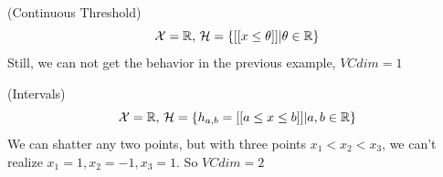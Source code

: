 \documentclass{article}
\begin{document}
\begin{example}(Continuous Threshold)
  \begin{displaymath}
	\mathcal{X}=\mathbb{R},\,\mathcal{H}=\{[[x\leq \theta]]|\theta\in \mathbb{R}\}
  \end{displaymath}
  Still, we can not get the behavior in the previous example, $VCdim=1$
\end{example}

\begin{example}(Intervals)
  \begin{displaymath}
	\mathcal{X}=\mathbb{R},\,\mathcal{H}=\{h_{a,b}=[[a\leq x \leq b]]|a,b\in \mathbb{R}\}
  \end{displaymath}
  We can shatter any two points, but with three points $x_1<x_2<x_3$, we can't realize $x_1=1, x_2=-1, x_3=1$. So $VCdim=2$
\end{example}
\end{document}
